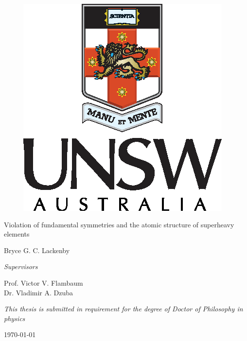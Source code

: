 \documentclass[10pt,a4paper, twoside, openright]{report}
\begin{document}
\begin{titlepage}
	\vspace{10cm}
	\centering
	\begin{figure}
\centering
\includegraphics[scale=1.2]{./figures/unsw-crest.eps}
\captionsetup[figure]{list=no}
\end{figure}
    \captionsetup[figure]{list=no}
	\vspace{3cm}
	\vfill
	{\huge Violation of fundamental symmetries and the atomic structure of superheavy elements\par}
	\vspace{2cm}
	{\Large Bryce G. C. Lackenby \par}
	\vfill
	{\normalsize \textit{Supervisors}\par}
	{\large Prof. Victor V. Flambaum} \\
	{\large Dr. Vladimir A. Dzuba} \\
	\centering

	\vfill

{\footnotesize \textit{This thesis is submitted in requirement for the degree of Doctor of Philosophy in physics}} \\
	{\large \today\par}
\end{titlepage}
\onehalfspacing

\tableofcontents
\end{document}
